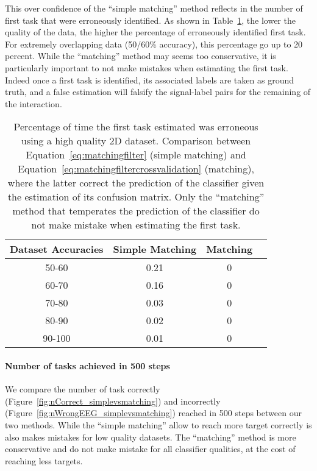 This over confidence of the ``simple matching'' method reflects in the number of first task that were erroneously identified. As shown in Table~\ref{tab:errorTaskRatiosimplevsmatching}, the lower the quality of the data, the higher the percentage of erroneously identified first task. For extremely overlapping data (50/60\% accuracy), this percentage go up to 20 percent. While the ``matching'' method may seems too conservative, it is particularly important to not make mistakes when estimating the first task. Indeed once a first task is identified, its associated labels are taken as ground truth, and a false estimation will falsify the signal-label pairs for the remaining of the interaction.

\begin{table}[!htbp]
\centering
{}
\begin{tabular}{c c c c}
    Dataset Accuracies & Simple Matching &  Matching \\ \hline
    50-60 & 0.21 & 0 \\ 
    60-70 & 0.16 & 0 \\
    70-80 & 0.03 & 0 \\
    80-90 & 0.02 & 0 \\
    90-100 & 0.01 & 0 \\
\end{tabular}
\caption{Percentage of time the first task estimated was erroneous using a high quality 2D dataset. Comparison between Equation~\ref{eq:matchingfilter} (simple matching) and Equation~\ref{eq:matchingfiltercrossvalidation} (matching), where the latter correct the prediction of the classifier given the estimation of its confusion matrix. Only the ``matching'' method that temperates the prediction of the classifier do not make mistake when estimating the first task.}
\label{tab:errorTaskRatiosimplevsmatching}
\end{table}

\paragraph{Number of tasks achieved in 500 steps}

We compare the number of task correctly (Figure~\ref{fig:nCorrect_simplevsmatching}) and incorrectly (Figure~\ref{fig:nWrongEEG_simplevsmatching}) reached in 500 steps between our two methods. While the ``simple matching'' allow to reach more target correctly is also makes mistakes for low quality datasets. The ``matching'' method is more conservative and do not make mistake for all classifier qualities, at the cost of reaching less targets.

